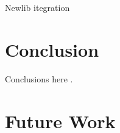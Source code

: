 \documentclass[11pt]{article}
\begin{document}
Newlib itegration

\section{Conclusion}
\label{sec:conclusion}

Conclusions here \cite{freebsd} \cite{unix}.

\section{Future Work}
\label{sec:future}


\onecolumn
\begin{sloppypar}
	
	
\end{sloppypar}

\end{document}
